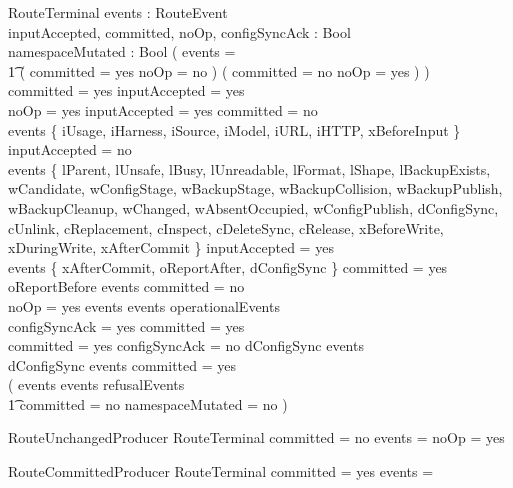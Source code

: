 \documentclass{article}
\begin{document}
\begin{schema}{RouteTerminal}
	events : \power RouteEvent \\
	inputAccepted, committed, noOp, configSyncAck : Bool \\
	namespaceMutated : Bool
	\where
	( events = \emptyset \implies \\
	\t1 ( committed = yes \land noOp = no ) \lor
		( committed = no \land noOp = yes ) ) \\
	committed = yes \implies inputAccepted = yes \\
	noOp = yes \implies inputAccepted = yes \land committed = no \\
	events \cap \{ iUsage, iHarness, iSource, iModel, iURL, iHTTP,
	xBeforeInput \} \neq \emptyset \implies inputAccepted = no \\
	events \cap \{ lParent, lUnsafe, lBusy, lUnreadable, lFormat, lShape,
	lBackupExists, wCandidate, wConfigStage, wBackupStage,
	wBackupCollision, wBackupPublish, wBackupCleanup, wChanged,
	wAbsentOccupied, wConfigPublish, dConfigSync, cUnlink, cReplacement,
	cInspect, cDeleteSync, cRelease, xBeforeWrite, xDuringWrite,
	xAfterCommit \} \neq \emptyset \implies inputAccepted = yes \\
	events \cap \{ xAfterCommit, oReportAfter, dConfigSync \} \neq \emptyset
	\implies committed = yes \\
	oReportBefore \in events \implies committed = no \\
	noOp = yes \land events \neq \emptyset \implies
	events \cap operationalEvents \neq \emptyset \\
	configSyncAck = yes \implies committed = yes \\
	committed = yes \land configSyncAck = no \implies dConfigSync \in events \\
	dConfigSync \in events \implies committed = yes \\
	( events \neq \emptyset \land events \subseteq refusalEvents \implies \\
	\t1 committed = no \land namespaceMutated = no )
\end{schema}

\begin{schema}{RouteUnchangedProducer}
	RouteTerminal
	\where
	committed = no \land events = \emptyset \land noOp = yes
\end{schema}

\begin{schema}{RouteCommittedProducer}
	RouteTerminal
	\where
	committed = yes \land events = \emptyset
\end{schema}
\end{document}
